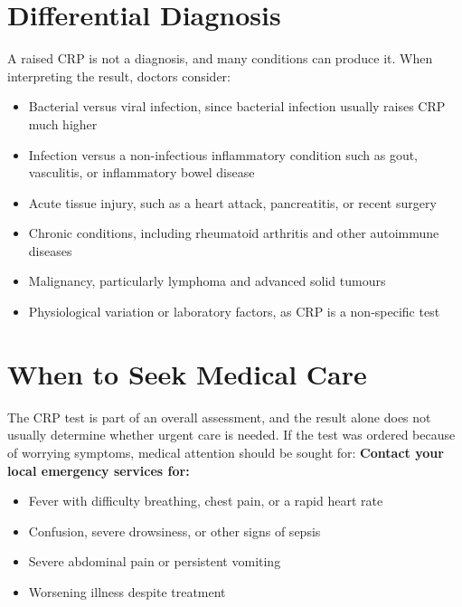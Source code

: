 \section*{Differential Diagnosis}
A raised CRP is not a diagnosis, and many conditions can produce it. When interpreting the result, doctors consider:
\begin{itemize}
    \item Bacterial versus viral infection, since bacterial infection usually raises CRP much higher
    \item Infection versus a non-infectious inflammatory condition such as gout, vasculitis, or inflammatory bowel disease
    \item Acute tissue injury, such as a heart attack, pancreatitis, or recent surgery
    \item Chronic conditions, including rheumatoid arthritis and other autoimmune diseases
    \item Malignancy, particularly lymphoma and advanced solid tumours
    \item Physiological variation or laboratory factors, as CRP is a non-specific test
\end{itemize}

\section*{When to Seek Medical Care}
The CRP test is part of an overall assessment, and the result alone does not usually determine whether urgent care is needed. If the test was ordered because of worrying symptoms, medical attention should be sought for:
\textbf{Contact your local emergency services for:}
\begin{itemize}
    \item Fever with difficulty breathing, chest pain, or a rapid heart rate
    \item Confusion, severe drowsiness, or other signs of sepsis
    \item Severe abdominal pain or persistent vomiting
    \item Worsening illness despite treatment
\end{itemize}

